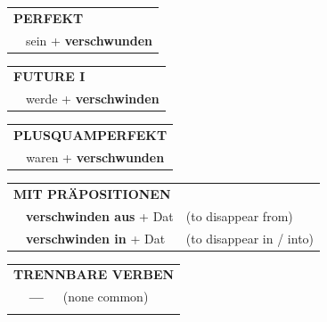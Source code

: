 \documentclass[10pt,a4paper]{revtex4-2}
\begin{document}
\begin{verbbox}
 \begin{tabular}{rl}
     \multicolumn{2}{l}{\textbf{PERFEKT}}\\
   & sein + \textbf{verschwunden}\\
  \end{tabular}
\hfill
   \begin{tabular}{rl}
    \multicolumn{2}{l}{\textbf{FUTURE I} }\\
   & werde + \textbf{verschwinden}\\
  \end{tabular}
\hfill
   \begin{tabular}{rl}
      \multicolumn{2}{l}{\textbf{PLUSQUAMPERFEKT}}\\
   & waren + \textbf{verschwunden}\\
  \end{tabular}

   \vspace{10pt}

   \begin{tabular}{lll}
      \multicolumn{3}{l}{\textbf{MIT PRÄPOSITIONEN}}\\
& \textbf{verschwinden aus} + Dat & (to disappear from)\\
& \textbf{verschwinden in} + Dat & (to disappear in / into)\\
\end{tabular}
  \hfill
   \begin{tabular}{lll}
      \multicolumn{3}{l}{\textbf{TRENNBARE VERBEN}}\\
 & \textbf{---} & (none common)\\
\vspace{10pt}
  \end{tabular}

  \vspace{-5pt}

\end{verbbox}
\end{document}
